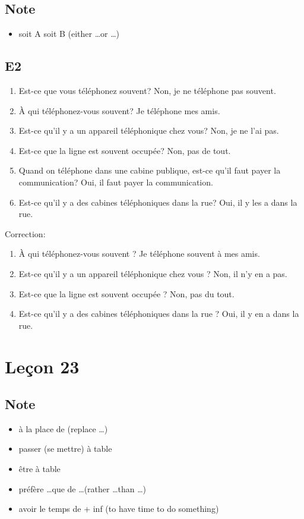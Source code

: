\documentclass{book}
\begin{document}
    \section{Note}
        \begin{itemize}
            \item soit A soit B (either \dots or \dots)
        \end{itemize}
    \section{E2}
        \begin{enumerate}
            \item Est-ce que vous téléphonez souvent? Non, je ne téléphone pas souvent.
            \item À qui téléphonez-vous souvent? Je téléphone mes amis.
            \item Est-ce qu'il y a un appareil téléphonique chez vous? Non, je ne l'ai pas.
            \item Est-ce que la ligne est souvent occupée? Non, pas de tout.
            \item Quand on téléphone dans une cabine publique, est-ce qu'il faut payer la communication? Oui, il faut payer la communication.
            \item Est-ce qu'il y a des cabines téléphoniques dans la rue? Oui, il y les a dans la rue.
        \end{enumerate}
        Correction:
        \begin{enumerate}
            \item À qui téléphonez-vous souvent ? Je téléphone souvent à mes amis.
            \item Est-ce qu'il y a un appareil téléphonique chez vous ? Non, il n'y en a pas.
            \item Est-ce que la ligne est souvent occupée ? Non, pas du tout.
            \item Est-ce qu'il y a des cabines téléphoniques dans la rue ? Oui, il y en a dans la rue.
        \end{enumerate}

\chapter{Leçon 23}
    \section{Note}
        \begin{itemize}
            \item à la place de (replace \dots)
            \item passer (se mettre) à table
            \item être à table 
            \item préfère \dots que de \dots (rather \dots than \dots)
            \item avoir le temps de + inf (to have time to do something)
        \end{itemize}
\end{document}
